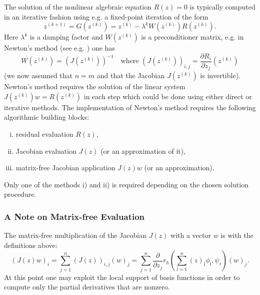 \documentclass[a4paper,12pt]{article}
\begin{document}
The solution of the nonlinear algebraic equation $R(z)=0$ is typically computed
in an iterative fashion using e.g. a fixed-point iteration of the form
\begin{equation}
z^{(k+1)} = G(z^{(k)}) = z^{(k)} - \lambda^{k} W(z^{(k)}) R(z^{(k)}) .
\end{equation}
Here $\lambda^{k}$ is a damping factor
and $W(z^{(k)})$ is a preconditioner matrix, e.g. in Newton's method (see e.g. \cite{Braess}) one
has 
\begin{equation*}
W(z^{(k)}) = (J(z^{(k)}))^{-1} \quad \text{where $(J(z^{(k)}))_{i,j} = \frac{\partial R_i}{\partial z_j}
(z^{(k)})$}
\end{equation*}
(we now assumed that $n=m$ and that the Jacobian $J(z^{(k)})$ is invertible).
Newton's method requires the solution of the linear system $J(z^{(k)}) w = R(z^{(k)})$ in each
step which could be done using either direct or iterative methods.
The implementation of  Newton's method requires the following
algorithmic building blocks:
\begin{enumerate}[i)]
\item residual evaluation $R(z)$,
\item Jacobian evaluation $J(z)$ (or an approximation of it),
\item matrix-free Jacobian application $J(z) w$ (or an approximation).
\end{enumerate}
Only one of the methods i) and ii) is required depending on the chosen
solution procedure.

\subsubsection*{A Note on Matrix-free Evaluation}

The matrix-free multiplication of the Jacobian $J(z)$ with a vector $w$ is with
the definitions above:
\begin{equation*}
(J(z) w)_i = \sum_{j=1}^n (J(z))_{i,j} (w)_j = \sum_{j=1}^n 
\frac{\partial}{\partial z_j} r_h\left(\sum_{l=1}^n (z)_l  \phi_l,\psi_i\right) (w)_j .
\end{equation*}
At this point one may exploit the local support of basis functions in order
to compute only the partial derivatives that are nonzero.
\end{document}
